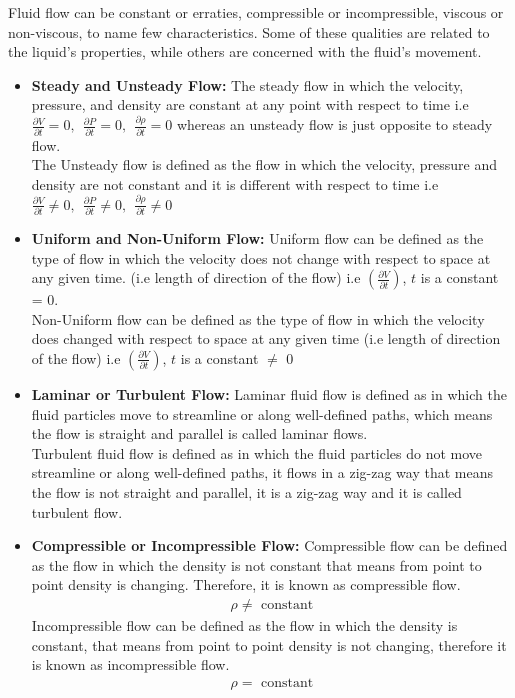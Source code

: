 \documentclass[11pt]{report}
\newcommand{\sps}{\\[0.2cm]}
\newcommand{\bt}[1]{\textbf{#1}}
\begin{document}
	Fluid flow can be constant or erraties, compressible or incompressible, viscous or non-viscous, to name few characteristics. Some of these qualities are related to the liquid's properties, while others are concerned with the fluid's movement.
	\begin{itemize}[label=--]
		\item \bt{Steady and Unsteady Flow:} The steady flow in which the velocity, pressure, and density are constant at any point with respect to time i.e $\frac{\partial V}{\partial t} = 0,~~ \frac{\partial P}{\partial t}=0,~~ \frac{\partial \rho}{\partial t} = 0$ whereas an unsteady flow is just opposite to steady flow.\sps
		The Unsteady flow is defined as the flow in which the velocity, pressure and density are not constant and it is different with respect to time i.e $\frac{\partial V}{\partial t} \neq 0,~~ \frac{\partial P}{\partial t} \neq 0,~~ \frac{\partial \rho}{\partial t} \neq 0$
		
		\item\bt{Uniform and Non-Uniform Flow:} Uniform flow can be defined as the type of flow in which the velocity does not change with respect to space at any given time. (i.e length of direction of the flow) i.e $\left(\frac{\partial V}{\partial t}\right)$, $t$ is a constant = 0.\sps
		Non-Uniform flow can be defined as the type of flow in which the velocity does changed with respect to space at any given time (i.e length of direction of the flow) i.e  $\left(\frac{\partial V}{\partial t}\right)$, $t$ is a constant $\neq$ 0 
		
		\item\bt{Laminar or Turbulent Flow:} Laminar fluid flow is defined as in which the fluid particles move to streamline or along well-defined paths, which means the flow is straight and parallel is called laminar flows.\sps
		Turbulent fluid flow is defined as in which the fluid particles do not move streamline or along well-defined paths, it flows in a zig-zag way that means the flow is not straight and parallel, it is a zig-zag way and it is called turbulent flow.
		
		\item\bt{Compressible or Incompressible Flow:} Compressible flow can be defined as the flow in which the density is not constant that means from point to point density is changing. Therefore, it is known as compressible flow.
		\begin{eqnarray*}
			\rho \neq \text{ constant}
		\end{eqnarray*}
		Incompressible flow can be defined as the flow in which the density is constant, that means from point to point density is not changing, therefore it is known as incompressible flow.
		\begin{eqnarray*}
			\rho = \text{ constant}
		\end{eqnarray*}
	

\end{itemize}
\end{document}
